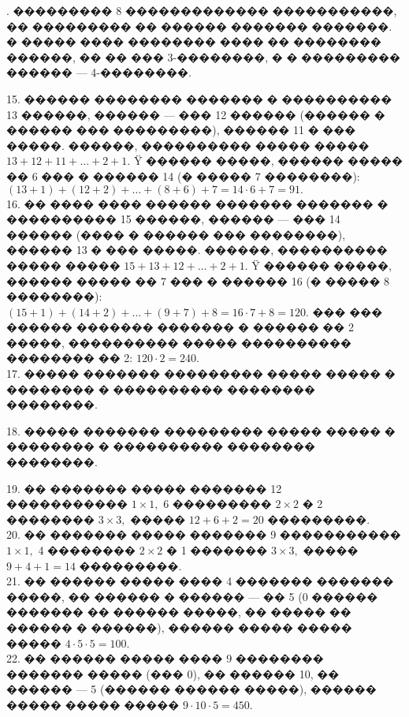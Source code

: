 \documentclass[12pt]{article}
\begin{document}
\newpage
{}. ��������� 8 ������������� �����������, �� ��������� �� ������ ������� �������. � ����� ���� �������� ���� �� �������� ������, �� �� ��� 3-��������, � � ��������� ������ --- 4-��������.
\begin{center}
\begin{figure}[h!]
\end{figure}
\end{center}
15. ������ �������� ������� � ���������� 13 ������, ������ --- ��� 12 ������ (������ � ������ ��� ���������), ������ 11 � ��� �����. ������, ���������� ����� ����� $13+12+11+\ldots+2+1.$ Ÿ ������ �����, ������ ����� �� 6 ��� � ������ 14 (� ����� 7 ��������): $(13+1)+(12+2)+\ldots+(8+6)+7=14\cdot6+7=91.$\\
16. �� ���� ���� ������ ������� ������� � ���������� 15 ������, ������ --- ��� 14 ������ (���� � ������ ��� ��������), ������ 13 � ��� �����. ������, ���������� ����� ����� $15+13+12+\ldots+2+1.$ Ÿ ������ �����, ������ ����� �� 7 ��� � ������ 16 (� ����� 8 ��������): $(15+1)+(14+2)+\ldots+(9+7)+8=16\cdot7+8=120.$ ��� ��� ������ ������� ������� � ������ �� 2 �����, ���������� ����� ���������� �������� �� 2: $120\cdot2=240.$\\
17. ����� ������� ��������� ����� ����� � �������� � ���������� �������� ��������.
\begin{center}
\begin{figure}[h!]
\end{figure}
\end{center}
18. ����� ������� ��������� ����� ����� � �������� � ���������� �������� ��������.
\begin{center}
\begin{figure}[h!]
\end{figure}
\end{center}
19. �� ������� ����� ������� 12 ����������� $1\times1,$ 6 ��������� $2\times2$ � 2 �������� $3\times3,$ ����� $12+6+2=20$ ���������.\\
20. �� ������� ����� ������� 9 ����������� $1\times1,$ 4 �������� $2\times2$ � 1 ������� $3\times3,$ ����� $9+4+1=14$ ���������.\\
21. �� ������ ����� ���� 4 ������� ������� �����, �� ������ � ������ --- �� 5 (0 ������ ������� �� ������ �����, �� ����� �� ������ � ������), ������ ����� ����� ����� $4\cdot5\cdot5=100.$\\
22. �� ������ ����� ���� 9 �������� ������� ����� (��� 0), �� ������ 10, �� ������ --- 5 (������ ������ �����), ������ ����� ����� ����� $9\cdot10\cdot5=450.$\\
\end{document}
